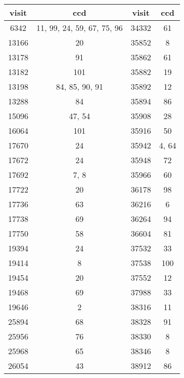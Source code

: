 \begin{table}[H]
\centering
\begin{tabular} {|c|c||c|c|}
\hline
visit & ccd & visit & ccd \\
\hline
6342 & 11, 99, 24, 59, 67, 75, 96 & 34332 & 61     \\      
13166 & 20                        & 35852 & 8      \\       
13178 & 91                        & 35862 & 61     \\      
13182 & 101                       & 35882 & 19     \\      
13198 & 84, 85, 90, 91            & 35892 & 12     \\      
13288 & 84                        & 35894 & 86     \\      
15096 & 47, 54                    & 35908 & 28     \\      
16064 & 101                       & 35916 & 50     \\      
17670 & 24                        & 35942 & 4, 64  \\   
17672 & 24                        & 35948 & 72     \\      
17692 & 7, 8                      & 35966 & 60     \\      
17722 & 20                        & 36178 & 98     \\      
17736 & 63                        & 36216 & 6      \\       
17738 & 69                        & 36264 & 94     \\      
17750 & 58                        & 36604 & 81     \\      
19394 & 24                        & 37532 & 33     \\      
19414 & 8                         & 37538 & 100    \\     
19454 & 20                        & 37552 & 12     \\      
19468 & 69                        & 37988 & 33     \\      
19646 & 2                         & 38316 & 11     \\      
25894 & 68                        & 38328 & 91     \\      
25956 & 76                        & 38330 & 8      \\       
25968 & 65                        & 38346 & 8      \\       
26054 & 43                        & 38912 & 86     \\      

\end{tabular}
\end{table}
